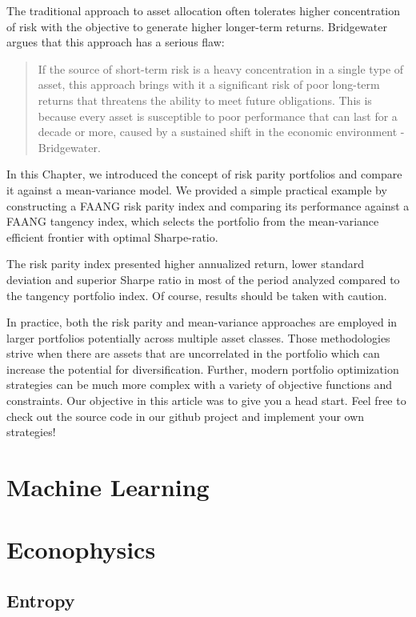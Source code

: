 \documentclass[]{book}
\theoremstyle{definition}
\theoremstyle{definition}
\theoremstyle{definition}
\theoremstyle{remark}
\begin{document}
The traditional approach to asset allocation often tolerates higher
concentration of risk with the objective to generate higher longer-term
returns. Bridgewater argues that this approach has a serious flaw:

\begin{quote}
If the source of short-term risk is a heavy concentration in a single
type of asset, this approach brings with it a significant risk of poor
long-term returns that threatens the ability to meet future obligations.
This is because every asset is susceptible to poor performance that can
last for a decade or more, caused by a sustained shift in the economic
environment - Bridgewater.
\end{quote}

In this Chapter, we introduced the concept of risk parity portfolios and
compare it against a mean-variance model. We provided a simple practical
example by constructing a FAANG risk parity index and comparing its
performance against a FAANG tangency index, which selects the portfolio
from the mean-variance efficient frontier with optimal Sharpe-ratio.

The risk parity index presented higher annualized return, lower standard
deviation and superior Sharpe ratio in most of the period analyzed
compared to the tangency portfolio index. Of course, results should be
taken with caution.

In practice, both the risk parity and mean-variance approaches are
employed in larger portfolios potentially across multiple asset classes.
Those methodologies strive when there are assets that are uncorrelated
in the portfolio which can increase the potential for diversification.
Further, modern portfolio optimization strategies can be much more
complex with a variety of objective functions and constraints. Our
objective in this article was to give you a head start. Feel free to
check out the source code in our github project and implement your own
strategies!

\part{Machine Learning}\label{part-machine-learning}

\part{Econophysics}\label{part-econophysics}

\chapter{Entropy}\label{entropy}
\end{document}
